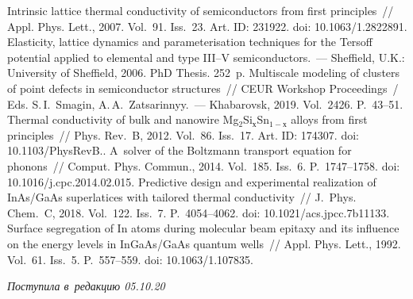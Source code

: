 \begin{multicols}{2}
{{\begin{thebibliography}{99}
 Intrinsic lattice thermal 
conductivity of semiconductors from first principles~// Appl. Phys. Lett., 2007. Vol.~91. Iss.~23. Art. 
ID: 231922. doi: 10.1063/1.2822891.
 Elasticity, lattice dynamics and parameterisation techniques for the Tersoff potential applied 
to elemental and type III--V semiconductors.~--- Sheffield, U.K.: University of Sheffield, 2006. PhD Thesis. 
252~p.
      Multiscale modeling of 
clusters of point defects in semiconductor structures~// CEUR Workshop Proceedings~/
Eds. S.\,I.~Smagin, A.\,A.~Zatsarinnyy.~--- Khabarovsk, 2019. Vol.~2426. P.~43--51.
      Thermal conductivity of bulk and 
nanowire Mg$_2$Si$_х$Sn$_{1-х}$ alloys from first principles~// Phys. Rev.~B, 2012. Vol.~86. Iss.~17. Art. 
ID: 174307. doi: 10.1103/\mbox{PhysRevB}..
      A~solver of the Boltzmann transport equation for 
phonons~// Comput. Phys. Commun., 2014. Vol.~185. Iss.~6. P.~1747--1758. doi: 
10.1016/j.cpc.2014.02.015.
      Predictive design and experimental realization of 
InAs/GaAs superlatices with tailored thermal conductivity~// J.~Phys. Chem.~C, 2018. Vol.~122. Iss.~7.  
P.~4054--4062. doi: 10.1021/acs.jpcc.7b11133.
 Surface segregation of In atoms during molecular beam 
epitaxy and its influence on the energy levels in InGaAs/GaAs quantum wells~// Appl. Phys. Lett., 1992. 
Vol.~61. Iss.~5. P.~557--559. doi: 10.1063/1.107835.
\end{thebibliography}

 }
 }

\end{multicols}

\vspace*{-3pt}

\hfill{\small\textit{Поступила в~редакцию 05.10.20}}



\newpage

